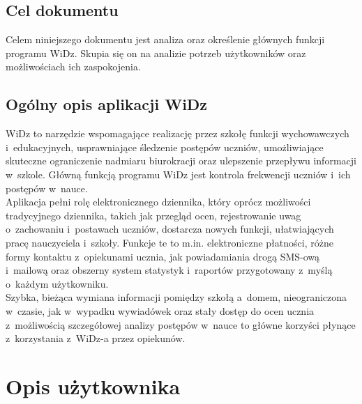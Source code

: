 \documentclass[12pt,leqno,twoside]{mwart}
\begin{document}
\subsection{Cel dokumentu}
\noindent Celem niniejszego dokumentu jest analiza oraz określenie głównych funkcji programu WiDz. Skupia się on na analizie potrzeb użytkowników oraz możliwościach ich zaspokojenia.\\

\subsection{Ogólny opis aplikacji WiDz}
\noindent WiDz to narzędzie wspomagające realizację przez szkołę funkcji wychowawczych i~edukacyjnych, usprawniające śledzenie postępów uczniów, umożliwiające skuteczne ograniczenie nadmiaru biurokracji oraz ulepszenie przepływu informacji w~szkole. Główną funkcją programu WiDz jest kontrola frekwencji uczniów i~ich postępów w~nauce.\\
\indent Aplikacja pełni rolę elektronicznego dziennika, który oprócz możliwości tradycyjnego dziennika, takich jak przegląd ocen, rejestrowanie uwag o~zachowaniu i~postawach uczniów, dostarcza nowych funkcji, ułatwiających pracę nauczyciela i~szkoły. Funkcje te to m.in. elektroniczne płatności, różne formy kontaktu z~opiekunami ucznia, jak powiadamiania drogą SMS-ową i~mailową oraz obszerny system statystyk i~raportów przygotowany z~myślą o~każdym użytkowniku.\\
\indent Szybka, bieżąca wymiana informacji pomiędzy szkołą a~domem, nieograniczona w~czasie, jak w~wypadku wywiadówek oraz stały dostęp do ocen ucznia z~możliwością szczegółowej analizy postępów w~nauce to główne korzyści płynące z~korzystania z~WiDz-a przez opiekunów.

\section{Opis użytkownika}
\end{document}
